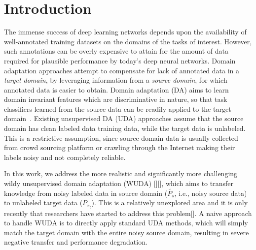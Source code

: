 \section{Introduction}
The immense success of deep learning networks depends upon the availability of well-annotated training datasets on the domains of the tasks of interest. 
However, such annotations can be overly expensive to attain for the amount of data required for plausible performance by today’s deep neural networks. 
Domain adaptation approaches attempt to compensate for lack of annotated data in a \textit{target domain}, by leveraging information from a \textit{source domain}, for which annotated data is easier to obtain. 
Domain adaptation (DA) aims to learn domain invariant features which are discriminative in nature, so that task classifiers learned from the source data can be readily applied to the target domain~\cite{uda,dann,ctc,ltdan,atda,saito2017maximum}.
Existing unsupervised DA (UDA) approaches assume that the source domain has clean labeled data training data, while the target data is unlabeled. 
This is a restrictive assumption, since source domain data is usually collected from crowd sourcing platform or crawling through the Internet making their labels noisy and not completely reliable.

In this work, we address the more realistic and significantly more challenging wildy unsupervised domain adaptation (WUDA) [][], which aims to transfer knowledge from noisy labeled data in source domain ($\tilde{P_s}$, i.e., noisy source data) to unlabeled target data ($P_{x_{t}}$).
This is a relatively unexplored area and it is only recently that researchers have started to address this problem[].
A naive approach to handle WUDA is to directly apply standard UDA methods, which will simply match the target domain with the entire noisy
source domain, resulting in severe negative transfer and performance degradation. 

